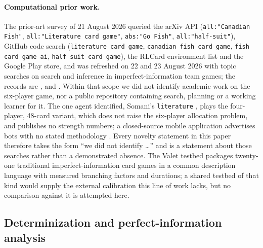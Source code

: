 \paragraph{Computational prior work.} The prior-art survey of 21 August 2026 queried the arXiv
API (\texttt{all:"Canadian Fish"}, \texttt{all:"Literature card game"}, \texttt{abs:"Go Fish"},
\texttt{all:"half-suit"}), GitHub code search (\texttt{literature card game}, \texttt{canadian fish
card game}, \texttt{fish card game ai}, \texttt{half suit card game}), the RLCard environment list
\cite{rlcard} and the Google Play store, and was refreshed on 22 and 23 August 2026 with topic
searches on search and inference in imperfect-information team games; the records are
,  and
. Within that scope we did not identify
academic work on the six-player game, nor a public repository containing search, planning or a
working learner for it. The one agent identified, Somani's \texttt{literature}
\cite{somani,somani-server}, plays the four-player, 48-card variant, which does not raise the
six-player allocation problem, and publishes no strength numbers; a closed-source mobile
application advertises bots with no stated methodology \cite{playstore}. Every novelty statement in
this paper therefore takes the form ``we did not identify \ldots{}'' and is a statement about those
searches rather than a demonstrated absence. The Valet testbed
\cite{goadrich2026valet} packages twenty-one traditional imperfect-information card games in a
common description language with measured branching factors and durations; a shared testbed of
that kind would supply the external calibration this line of work lacks, but no comparison against
it is attempted here.

\subsection{Determinization and perfect-information analysis}
\label{sec:related-determinization}

